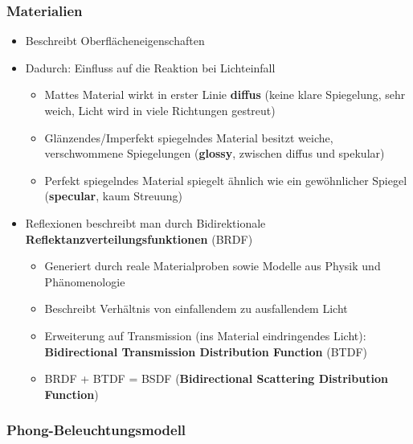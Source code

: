 \documentclass[10pt,a4paper]{article}
\begin{document}
	\subsubsection{Materialien}
	\label{rt:ssub:materialien}

	\begin{itemize}
		\item Beschreibt Oberflächeneigenschaften
		\item Dadurch: Einfluss auf die Reaktion bei Lichteinfall
		\begin{itemize}
			\item Mattes Material wirkt in erster Linie \textbf{diffus} (keine klare Spiegelung, sehr weich, Licht wird in viele Richtungen gestreut)
			\item Glänzendes/Imperfekt spiegelndes Material besitzt weiche, verschwommene Spiegelungen (\textbf{\glqq glossy\grqq}, zwischen diffus und spekular)
			\item Perfekt spiegelndes Material spiegelt ähnlich wie ein gewöhnlicher Spiegel (\textbf{\glqq specular\grqq}, kaum Streuung)
		\end{itemize}
		\item Reflexionen beschreibt man durch Bidirektionale \textbf{Reflektanzverteilungsfunktionen} (BRDF)
		\begin{itemize}
			\item Generiert durch reale Materialproben sowie Modelle aus Physik und Phänomenologie
			\item Beschreibt Verhältnis von einfallendem zu ausfallendem Licht
			\item Erweiterung auf Transmission (ins Material eindringendes Licht): \textbf{Bidirectional Transmission Distribution Function} (BTDF)
			\item BRDF + BTDF = BSDF (\textbf{Bidirectional Scattering Distribution Function})
		\end{itemize}
	\end{itemize}

	\subsubsection{Phong-Beleuchtungsmodell}
	\label{rt:ssub:phong_beleuchtungsmodell}
	
\end{document}
